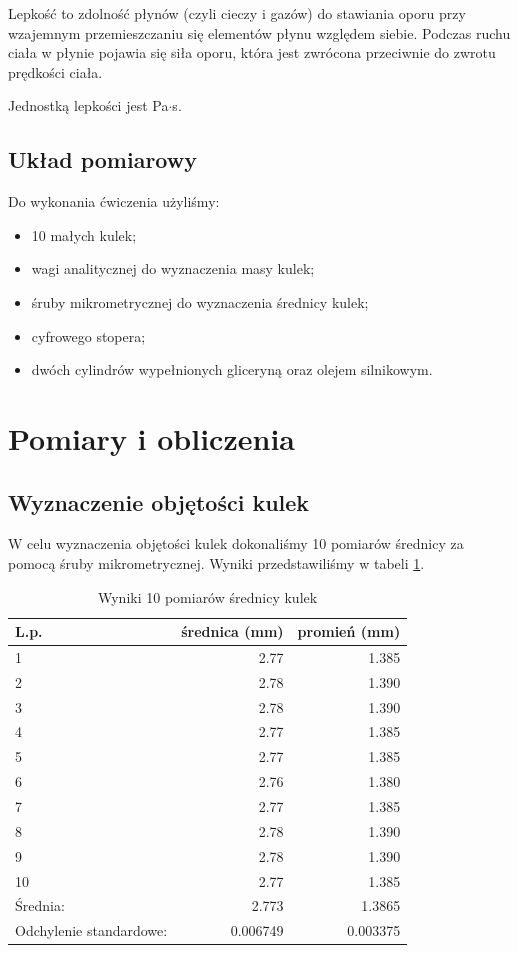 \documentclass[a4paper]{article}
\begin{document}
Lepkość to zdolność płynów (czyli cieczy i gazów) do stawiania oporu przy wzajemnym przemieszczaniu się elementów płynu względem siebie.
Podczas ruchu ciała w płynie pojawia się siła oporu, która jest zwrócona przeciwnie do zwrotu prędkości ciała.

Jednostką lepkości jest Pa$\cdot$s.

\subsection{Układ pomiarowy}

Do wykonania ćwiczenia użyliśmy:

\begin{itemize}
	\item 10 małych kulek;
	\item wagi analitycznej do wyznaczenia masy kulek;
	\item śruby mikrometrycznej do wyznaczenia średnicy kulek;
	\item cyfrowego stopera;
	\item dwóch cylindrów wypełnionych gliceryną oraz olejem silnikowym.
\end{itemize}

\section{Pomiary i obliczenia}

\subsection{Wyznaczenie objętości kulek}

W celu wyznaczenia objętości kulek dokonaliśmy 10 pomiarów średnicy za pomocą śruby mikrometrycznej.
Wyniki przedstawiliśmy w tabeli \ref{kulki_srednica}.

\begin{table}[h!]
	\centering
	\begin{tabular}{lrr}
		\toprule
		L.p. &  średnica (mm) &  promień (mm) \\
		\midrule
		1 &           2.77 &         1.385 \\
		2 &           2.78 &         1.390 \\
		3 &           2.78 &         1.390 \\
		4 &           2.77 &         1.385 \\
		5 &           2.77 &         1.385 \\
		6 &           2.76 &         1.380 \\
		7 &           2.77 &         1.385 \\
		8 &           2.78 &         1.390 \\
		9 &           2.78 &         1.390 \\
		10 &           2.77 &         1.385 \\
		\midrule
		Średnia: & 2.773 & 1.3865 \\
		Odchylenie standardowe: & 0.006749 & 0.003375 \\
		\bottomrule
	\end{tabular}
	\caption{Wyniki 10 pomiarów średnicy kulek}
	\label{kulki_srednica}
\end{table}
\end{document}
